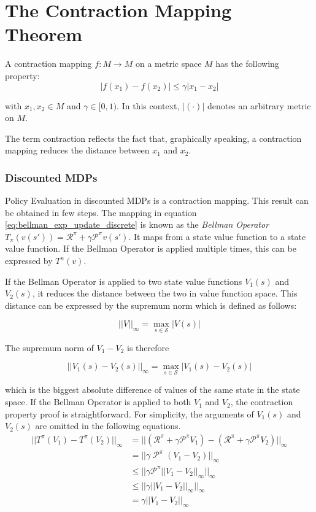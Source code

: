 \section{The Contraction Mapping Theorem}
\label{sec:contraction_mappings}
A contraction mapping $f: M \to M$ on a metric space $M$ has the following property:
\begin{equation}
|f(x_1)-f(x_2)| \leq \gamma |x_1-x_2|
\end{equation}

with $x_1,x_2 \in M$ and $\gamma \in [0,1)$. In this context,  $|(\cdot)|$ denotes an arbitrary metric on $M$.

The term contraction reflects the fact that, graphically speaking, a contraction mapping reduces the distance between $x_1$ and $x_2$.

\subsubsection{Discounted MDPs}

Policy Evaluation in discounted MDPs is a contraction mapping. This result can be obtained in few steps. The mapping in equation \ref{eq:bellman_exp_update_discrete} is known as the \textit{Bellman Operator} $T_\pi(v(s'))=\mathcal{R}^\pi+\gamma \mathcal{P}^\pi v(s')$. It maps from a state value function to a state value function. If the Bellman Operator is applied multiple times, this can be expressed by $T^n(v)$.

If the Bellman Operator is applied to two state value functions $V_1(s)$ and $V_2(s)$, it reduces the distance between the two in value function space. This distance can be expressed by the supremum norm which is defined as follows:

\begin{equation}
||V||_\infty = \max_{s \in \mathcal{S}} |V(s)|
\end{equation}

The supremum norm of $V_1 - V_2$ is therefore

\begin{equation}
||V_1(s) - V_2(s)||_\infty = \max_{s \in \mathcal{S}} |V_1(s)-V_2(s)|
\end{equation}

which is the biggest absolute difference of values of the same state in the state space. If the Bellman Operator is applied to both $V_1$ and $V_2$, the contraction property proof is straightforward. For simplicity, the arguments of $V_1(s)$ and $V_2(s)$ are omitted in the following equations.
\begin{align}
||T^\pi(V_1)-T^\pi(V_2)||_\infty &= ||(\mathcal{R}^\pi+\gamma \mathcal{P}^\pi V_1)-(\mathcal{R}^\pi+\gamma \mathcal{P}^\pi V_2)||_\infty \label{eq:4.15}\\
&=||\gamma\; \mathcal{P}^\pi\;(V_1 - V_2)||_\infty \label{eq:4.16}\\
&\leq ||\gamma \mathcal{P}^\pi ||V_1 - V_2||_\infty ||_\infty \label{eq:4.17} \\
&\leq ||\gamma ||V_1 - V_2||_\infty ||_\infty \label{eq:4.18}\\
&=\gamma ||V_1 - V_2||_\infty \label{eq:4.19}
\end{align} 

